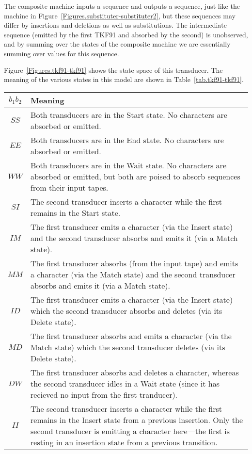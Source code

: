 \documentclass{article}
\newcommand{\tabnum}[1]{\ref{tab.#1}}
\newcommand{\tabref}[1]{Table~\tabnum{#1}}
\newcommand{\figref}[1]{Figure~\ref{Figures.#1}}
\begin{document}
The composite machine inputs a sequence and outputs a sequence, just like the machine
in  \figref{substituter-substituter2}, but these sequences may differ by insertions and deletions
as well as substitutions. 
The intermediate sequence (emitted by the first TKF91 and absorbed by the second) is unobserved,
and by summing over the states of the composite machine we are essentially summing over
values for this sequence. 

\figref{tkf91-tkf91} shows the state space of this transducer.  
The meaning of the various states in this model are shown in \tabref{tkf91-tkf91}.

\begin{table}
\begin{tabular}{c|p{}}
$b_1 b_2$ & Meaning \\
\hline
$SS$ & Both transducers are in the Start state.  No characters are absorbed or emitted. \\
$EE$ & Both transducers are in the End state.  No characters are  absorbed or emitted. \\
$WW$ & Both transducers are in the Wait state.  No characters are absorbed or emitted, but both are poised to absorb sequences from their input tapes. \\
$SI$ & The second transducer inserts a character while the first remains in the Start state.  \\
$IM$ & The first transducer  emits a character (via the Insert state) and the second transducer absorbs and emits it (via a Match state).  \\
$MM$ & The first transducer  absorbs (from the input tape) and emits a character (via the Match state) and the second transducer absorbs and emits it (via a Match state).  \\
$ID$ & The first transducer  emits a character (via the Insert state) which the second transducer absorbs and deletes (via its Delete state).  \\
$MD$ & The first transducer  absorbs and emits a character (via the Match state) which the second transducer deletes (via its Delete state).  \\
$DW$ & The first transducer absorbs and deletes a character, whereas the second transducer idles in a Wait state (since it has recieved no input from the first tranducer).   \\
$II$ & The second transducer inserts a character while the first remains in the Insert state from a previous insertion.  Only the second transducer is emitting a character here---the first is resting in an insertion state from a previous transition.   \\

\end{tabular}
\end{table}
\end{document}
